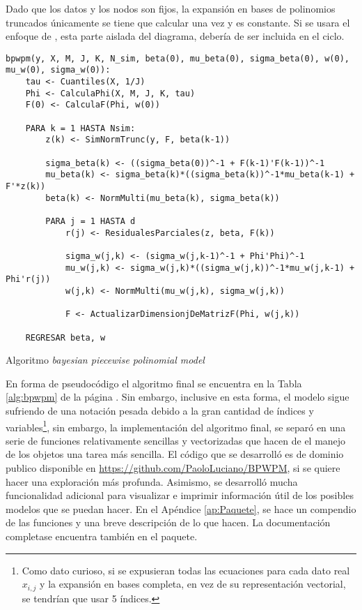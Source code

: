 \documentclass[../Main/Main.tex]{subfiles}
\begin{document}
Dado que los datos y los nodos son fijos, la expansión en bases de polinomios truncados únicamente se tiene que calcular una vez y es constante. Si se usara el enfoque de \autocite{mallik1998automatic}, esta parte aislada del diagrama, debería de ser incluida en el ciclo.\\

\begin{table}[h]
\makebox[\linewidth]{\rule{\textwidth}{0.4pt}}
\begin{verbatim}
bpwpm(y, X, M, J, K, N_sim, beta(0), mu_beta(0), sigma_beta(0), w(0), mu_w(0), sigma_w(0)):    
    tau <- Cuantiles(X, 1/J)
    Phi <- CalculaPhi(X, M, J, K, tau)
    F(0) <- CalculaF(Phi, w(0))
        
    PARA k = 1 HASTA Nsim:
        z(k) <- SimNormTrunc(y, F, beta(k-1))
            
        sigma_beta(k) <- ((sigma_beta(0))^-1 + F(k-1)'F(k-1))^-1
        mu_beta(k) <- sigma_beta(k)*((sigma_beta(k))^-1*mu_beta(k-1) + F'*z(k))
        beta(k) <- NormMulti(mu_beta(k), sigma_beta(k)) 
            
        PARA j = 1 HASTA d
            r(j) <- ResidualesParciales(z, beta, F(k))
                
            sigma_w(j,k) <- (sigma_w(j,k-1)^-1 + Phi'Phi)^-1
            mu_w(j,k) <- sigma_w(j,k)*((sigma_w(j,k))^-1*mu_w(j,k-1) + Phi'r(j))
            w(j,k) <- NormMulti(mu_w(j,k), sigma_w(j,k)) 
            
            F <- ActualizarDimensionjDeMatrizF(Phi, w(j,k))    
            
    REGRESAR beta, w
\end{verbatim} 
\makebox[\linewidth]{\rule{\textwidth}{0.4pt}}
\caption{Algoritmo \textit{bayesian piecewise polinomial model}}
\label{alg:bpwpm}
\end{table}

En forma de pseudocódigo el algoritmo final se encuentra en la Tabla \ref{alg:bpwpm} de la página \pageref{alg:bpwpm}. Sin embargo, inclusive en esta forma, el modelo sigue sufriendo de una notación pesada debido a la gran cantidad de índices y variables\footnote{Como dato curioso, si se expusieran todas las ecuaciones para cada dato real $x_{i,j}$ y la expansión en bases completa, en vez de su representación vectorial, se tendrían que usar 5 índices.}, sin embargo, la implementación del algoritmo final, se separó en una serie de funciones relativamente sencillas y vectorizadas que hacen de el manejo de los objetos una tarea más sencilla. El código que se desarrolló es de dominio publico disponible en \url{https://github.com/PaoloLuciano/BPWPM}, si se quiere hacer una exploración más profunda. Asimismo, se desarrolló mucha funcionalidad adicional para visualizar e imprimir información útil de los posibles modelos que se puedan hacer. En el Apéndice \ref{ap:Paquete}, se hace un compendio de las funciones y una breve descripción de lo que hacen. La documentación completase encuentra también en el paquete.
\end{document}
